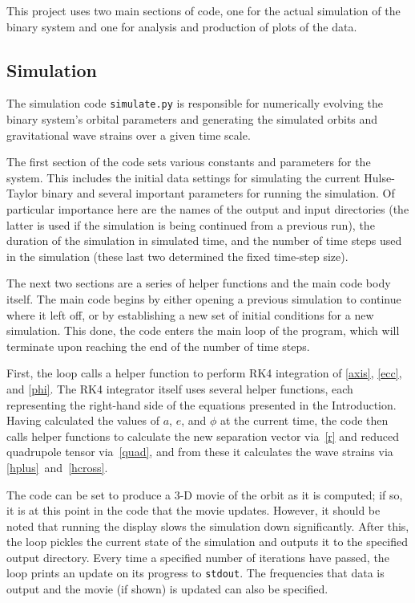 \documentclass[preprint2]{aastex}
\begin{document}
This project uses two main sections of code, one for the actual simulation of the binary system and one for analysis and production of plots of the data.

\subsection{Simulation}

The simulation code \texttt{simulate.py} is responsible for numerically evolving the binary system's orbital parameters and generating the simulated orbits and gravitational wave strains over a given time scale.

The first section of the code sets various constants and parameters for the system. This includes the initial data settings for simulating the current Hulse-Taylor binary and several important parameters for running the simulation. Of particular importance here are the names of the output and input directories (the latter is used if the simulation is being continued from a previous run), the duration of the simulation in simulated time, and the number of time steps used in the simulation (these last two determined the fixed time-step size).

The next two sections are a series of helper functions and the main code body itself. The main code begins by either opening a previous simulation to continue where it left off, or by establishing a new set of initial conditions for a new simulation. This done, the code enters the main loop of the program, which will terminate upon reaching the end of the  number of time steps.

First, the loop calls a helper function to perform RK4 integration of \eqref{axis}, \eqref{ecc}, and \eqref{phi}. The RK4 integrator itself uses several helper functions, each representing the right-hand side of the equations presented in the Introduction. Having calculated the values of $a$, $e$, and $\phi$ at the current time, the code then calls helper functions to calculate the new separation vector via~\eqref{r} and reduced quadrupole tensor via~\eqref{quad}, and from these it calculates the wave strains via \eqref{hplus}~and~\eqref{hcross}.

The code can be set to produce a 3-D movie of the orbit as it is computed; if so, it is at this point in the code that the movie updates. However, it should be noted that running the display slows the simulation down significantly. After this, the loop pickles the current state of the simulation and outputs it to the specified output directory. Every time a specified number of iterations have passed, the loop prints an update on its progress to \texttt{stdout}. The frequencies that data is output and the movie (if shown) is updated can also be specified.
\end{document}
